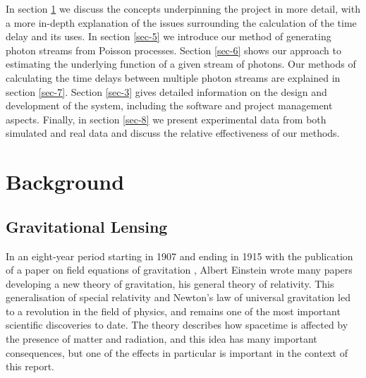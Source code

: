 \documentclass[a4paper,11pt]{article}
\begin{document}
In section \ref{sec-2} we discuss the concepts underpinning the project in more
detail, with a more in-depth explanation of the issues surrounding the
calculation of the time delay and its uses. In section \ref{sec-5} we introduce our method of generating photon streams from Poisson
processes. Section \ref{sec-6} shows our approach to estimating the
underlying function of a given stream of photons. Our methods of calculating the
time delays between multiple photon streams are explained in section \ref{sec-7}. Section \ref{sec-3} gives detailed information on the design and
development of the system, including the software and project management
aspects. Finally, in section \ref{sec-8} we present experimental data from both
simulated and real data and discuss the relative effectiveness of our methods.
\section{Background}
\label{sec-2}
\subsection{Gravitational Lensing}
\label{sec-2-1}

In an eight-year period starting in 1907 and ending in 1915 with the publication
of a paper on field equations of gravitation \cite{einstein1915general}, Albert
Einstein wrote many papers developing a new theory of gravitation, his general
theory of relativity. This generalisation of special relativity and Newton's law
of universal gravitation led to a revolution in the field of physics, and
remains one of the most important scientific discoveries to date. The theory
describes how spacetime is affected by the presence of matter and radiation, and
this idea has many important consequences, but one of the effects in particular
is important in the context of this report.
\end{document}
